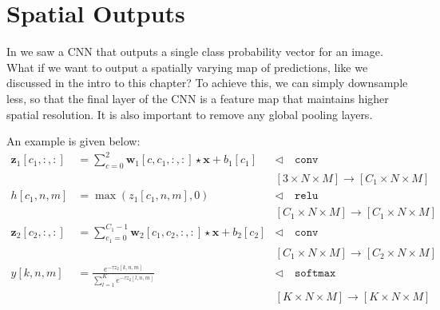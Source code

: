 \section{Spatial Outputs}\label{sec:convolutional_neural_networks:spatial_outputs}
In \sect{\ref{sec:convolutional_neural_nets:simple_CNN}} we saw a CNN that outputs a single class probability vector for an image. What if we want to output a spatially varying map of predictions, like we discussed in the intro to this chapter? To achieve this, we can simply downsample less, so that the final layer of the CNN is a feature map that maintains higher spatial resolution. It is also important to remove any global pooling layers.

An example is given below:
\begin{align}
    \mathbf{z}_1[c_1,:,:] & = \sum_{c=0}^2 \mathbf{w}_1[c,c_1,:,:] \star \mathbf{x} + b_1[c_1]           & \triangleleft \quad \texttt{conv}                                    \\
                          &                                                                              & [3 \times N \times M] \rightarrow [C_1 \times N \times M]\nonumber   \\
    h[c_1,n,m]            & = \max(z_1[c_1,n,m],0)                                                       & \triangleleft \quad \texttt{relu}                                    \\
                          &                                                                              & [C_1 \times N \times M] \rightarrow [C_1 \times N \times M]\nonumber \\
    \mathbf{z}_2[c_2,:,:] & = \sum_{c_1=0}^{C_1-1} \mathbf{w}_2[c_1,c_2,:,:] \star \mathbf{x} + b_2[c_2] & \triangleleft \quad \texttt{conv}                                    \\
                          &                                                                              & [C_1 \times N \times M] \rightarrow [C_2 \times N \times M]\nonumber \\
    y[k,n,m]              & = \frac{e^{-\tau z_2[k,n,m]}}{\sum_{l=1}^K e^{-\tau z_2[l,n,m]}}             & \triangleleft \quad \texttt{softmax}                                 \\
                          &                                                                              & [K \times N \times M] \rightarrow [K \times N \times M]\nonumber
\end{align}

